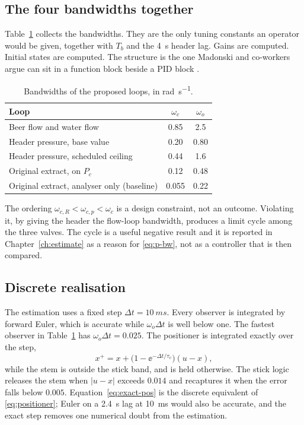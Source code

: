 \subsection{The four bandwidths together}

Table~\ref{tab:bw} collects the bandwidths. They are the only tuning constants an operator would be given, together with $T_b$ and the \SI{4}{s} header lag. Gains are computed. Initial states are computed. The structure is the one Madonski and co-workers argue can sit in a function block beside a PID block \cite{madonski2019error,wu2021transition}.

\begin{table}[htbp]
\centering
\caption{Bandwidths of the proposed loops, in \si{\radian\per\second}.}
\label{tab:bw}
\begin{tabular}{@{}lcc@{}}
\toprule
Loop & $\omega_c$ & $\omega_o$ \\
\midrule
Beer flow and water flow & 0.85 & 2.5 \\
Header pressure, base value & 0.20 & 0.80 \\
Header pressure, scheduled ceiling & 0.44 & 1.6 \\
Original extract, on $P_c$ & 0.12 & 0.48 \\
Original extract, analyser only (baseline) & 0.055 & 0.22 \\
\bottomrule
\end{tabular}
\end{table}

The ordering $\omega_{c,R} < \omega_{c,p} < \omega_c$ is a design constraint, not an outcome. Violating it, by giving the header the flow-loop bandwidth, produces a limit cycle among the three valves. The cycle is a useful negative result and it is reported in Chapter~\ref{ch:estimate} as a reason for \eqref{eq:p-bw}, not as a controller that is then compared.

\subsection{Discrete realisation}

The estimation uses a fixed step $\Delta t = \SI{10}{ms}$. Every observer is integrated by forward Euler, which is accurate while $\omega_o \Delta t$ is well below one. The fastest observer in Table~\ref{tab:bw} has $\omega_o\Delta t = 0.025$. The positioner is integrated exactly over the step,
\begin{equation}
\label{eq:exact-pos}
x^+ = x + \big(1-\ee^{-\Delta t/\tau_v}\big)(u-x),
\end{equation}
while the stem is outside the stick band, and is held otherwise. The stick logic releases the stem when $|u-x|$ exceeds $0.014$ and recaptures it when the error falls below $0.005$. Equation~\eqref{eq:exact-pos} is the discrete equivalent of \eqref{eq:positioner}; Euler on a \SI{2.4}{s} lag at \SI{10}{ms} would also be accurate, and the exact step removes one numerical doubt from the estimation.

